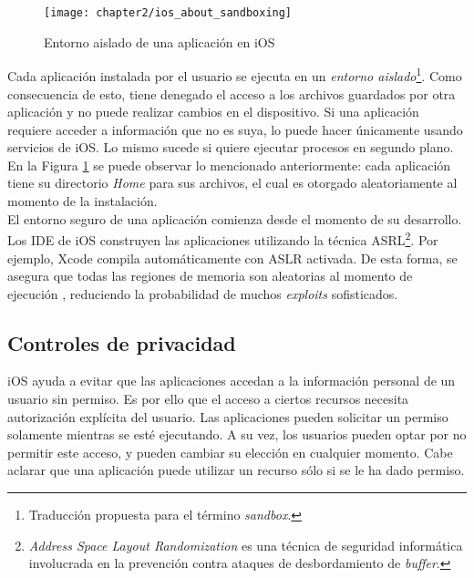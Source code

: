 \begin{figure}[hbtp]
	\centering
	\texttt{[image: chapter2/ios\_about\_sandboxing]}
    \caption{Entorno aislado de una aplicación en iOS \cite{iosdl}} 
    \label{fig:ch02:sandboxing}
\end{figure}
Cada aplicación instalada por el usuario se ejecuta en un \emph{entorno aislado}\footnote{Traducción propuesta para el término \textit{sandbox}.}. Como consecuencia de esto, tiene denegado el acceso a los archivos guardados por otra aplicación y no puede realizar cambios en el dispositivo. Si una aplicación requiere acceder a información que no es suya, lo puede hacer únicamente usando servicios de iOS. Lo mismo sucede si quiere ejecutar procesos en segundo plano. En la Figura \ref{fig:ch02:sandboxing} se puede observar lo mencionado anteriormente: cada aplicación tiene su directorio \textit{Home} para sus archivos, el cual es otorgado aleatoriamente al momento de la instalación.\\

El entorno seguro de una aplicación comienza desde el momento de su desarrollo. Los IDE de iOS construyen las aplicaciones utilizando la técnica ASRL\footnote{\textit{Address Space Layout Randomization} es una técnica de seguridad informática involucrada en la prevención contra ataques de desbordamiento de \textit{buffer}.}. Por ejemplo, Xcode compila automáticamente con ASLR activada. De esta forma, se asegura que todas las regiones de memoria son aleatorias al momento de ejecución \cite{asg}, reduciendo la probabilidad de muchos \textit{exploits} sofisticados.
\subsection{Controles de privacidad}
iOS ayuda a evitar que las aplicaciones accedan a la información personal de un usuario sin permiso. Es por ello que el acceso a ciertos recursos necesita autorización explícita del usuario. Las aplicaciones pueden solicitar un permiso solamente mientras se esté ejecutando. A su vez, los usuarios pueden optar por no permitir este acceso, y pueden cambiar su elección en cualquier momento. Cabe aclarar que una aplicación puede utilizar un recurso sólo si se le ha dado permiso.\\

